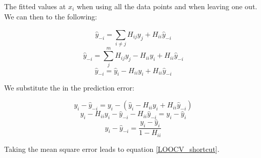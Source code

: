 \noindent The fitted values at $ x_i$ when using all the data points and when leaving one out. We can then to the following:

\[ \hat{y}_{-i} = \sum_{i\neq j}^{} H_{ij} y_j + H_{ii} \hat{y}_{-i} \]
\[ \hat{y}_{-i} = \sum_{j}^{m} H_{ij} y_j - H_{ii} y_i + H_{ii} \hat{y}_{-i} \]
\[ \hat{y}_{-i} = \hat{y}_{i} - H_{ii} y_{i} + H_{ii} \hat{y}_{-i}  \]


We substitute the in the prediction error: 

\[ y_i - \hat{y}_{-i} = y_i - (\hat{y}_{i} - H_{ii} y_{i} + H_{ii} \hat{y}_{-i} ) \]
\[ y_i - H_{ii}y_{i} - \hat{y}_{-i} - H_{ii}\hat{y}_{-i} = y_i - \hat{y}_i \]
\[ y_i - \hat{y}_{-i} = \frac{y_i - \hat{y}_{i}}{1 - H_{ii}}\]

Taking the mean square error leads to equation \ref{LOOCV_shortcut}. 











